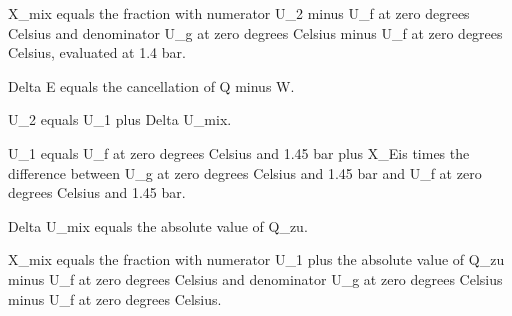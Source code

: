 X_mix equals the fraction with numerator U_2 minus U_f at zero degrees Celsius and denominator U_g at zero degrees Celsius minus U_f at zero degrees Celsius, evaluated at 1.4 bar.

Delta E equals the cancellation of Q minus W.

U_2 equals U_1 plus Delta U_mix.

U_1 equals U_f at zero degrees Celsius and 1.45 bar plus X_Eis times the difference between U_g at zero degrees Celsius and 1.45 bar and U_f at zero degrees Celsius and 1.45 bar.

Delta U_mix equals the absolute value of Q_zu.

X_mix equals the fraction with numerator U_1 plus the absolute value of Q_zu minus U_f at zero degrees Celsius and denominator U_g at zero degrees Celsius minus U_f at zero degrees Celsius.
